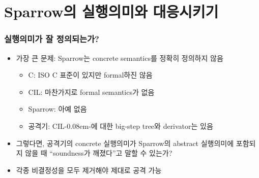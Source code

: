\documentclass{simplesnt}
\newcommand{\CILmm}{\texorpdfstring{CIL-\kern0.08em-}{CIL--}}
\begin{document}
\section{Sparrow의 실행의미와 대응시키기}

\begin{frame}
  \frametitle{실행의미가 잘 정의되는가?}

  \begin{itemize}
    \item<1-> 가장 큰 문제: Sparrow는 concrete semantics를 정확히 정의하지 않음
      \begin{itemize}
        \item<2-> C: ISO C 표준이 있지만 formal하진 않음
        \item<3-> CIL: 마찬가지로 formal semantics가 없음
        \item<4-> Sparrow: 아예 없음
        \item<5-> 공격기: \CILmm{}에 대한 big-step tree와 derivator는 있음
      \end{itemize}
    \item<6-> 그렇다면, 공격기의 concrete 실행의미가 Sparrow의 abstract 실행의미에
      포함되지 않을 때 ``soundness가 깨졌다''고 말할 수 있는가?
    \item<7-> 각종 비결정성을 모두 제거해야 제대로 공격 가능
  \end{itemize}
\end{frame}
\end{document}

